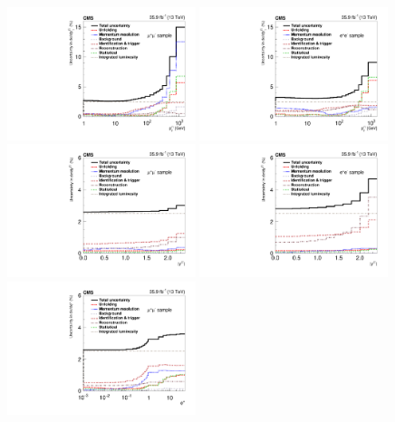 \begin{figure}
	\centering
	\includegraphics[width=0.49\textwidth]{figures/zpt/histoUnfoldingSystPt_nsel0_dy3.pdf}
        \includegraphics[width=0.49\textwidth]{figures/zpt/histoUnfoldingSystPt_nsel1_dy3.pdf}
	\includegraphics[width=0.49\textwidth]{figures/zpt/histoUnfoldingSystRap_nsel0_dy3.pdf}
        \includegraphics[width=0.49\textwidth]{figures/zpt/histoUnfoldingSystRap_nsel1_dy3.pdf}
	\includegraphics[width=0.49\textwidth]{figures/zpt/histoUnfoldingSystPhiStar_nsel0_dy3.pdf}

\end{figure}
